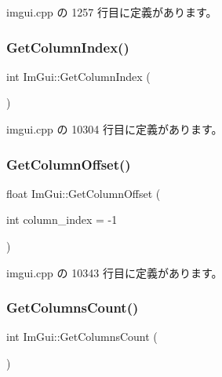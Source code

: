  imgui.\+cpp の 1257 行目に定義があります。

\mbox{\label{namespace_im_gui_acc31f8eea4fcfb86edeb3ac12d82fc05}} 
\subsubsection{\texorpdfstring{Get\+Column\+Index()}{GetColumnIndex()}}
{\footnotesize\ttfamily int Im\+Gui\+::\+Get\+Column\+Index (\begin{DoxyParamCaption}{ }\end{DoxyParamCaption})}



 imgui.\+cpp の 10304 行目に定義があります。

\mbox{\label{namespace_im_gui_a79c22e9c5c208b6c9534a273be71a9e6}} 
\subsubsection{\texorpdfstring{Get\+Column\+Offset()}{GetColumnOffset()}}
{\footnotesize\ttfamily float Im\+Gui\+::\+Get\+Column\+Offset (\begin{DoxyParamCaption}\item[{int}]{column\+\_\+index = {\ttfamily -\/1} }\end{DoxyParamCaption})}



 imgui.\+cpp の 10343 行目に定義があります。

\mbox{\label{namespace_im_gui_a3c2998ad9527948a4e4166c4f7db9ec9}} 
\subsubsection{\texorpdfstring{Get\+Columns\+Count()}{GetColumnsCount()}}
{\footnotesize\ttfamily int Im\+Gui\+::\+Get\+Columns\+Count (\begin{DoxyParamCaption}{ }\end{DoxyParamCaption})}



